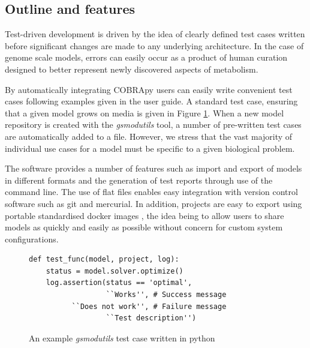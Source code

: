 \documentclass[journal=asbcd6]{achemso}
\begin{document}
\subsection{Outline and features}
Test-driven development is driven by the idea of clearly defined test cases written before significant changes are made to any underlying architecture.
In the case of genome scale models, errors can easily occur as a product of human curation designed to better represent newly discovered aspects of metabolism.

By automatically integrating COBRApy \cite{ebrahim2013cobrapy} users can easily write convenient test cases following examples given in the user guide.
A standard test case, ensuring that a given model grows on media is given in Figure \ref{fig:test_case}.
When a new model repository is created with the \textit{gsmodutils} tool, a number of pre-written test cases are automatically added to a file.
However, we stress that the vast majority of individual use cases for a model must be specific to a given biological problem.

The software provides a number of features such as import and export of models in different formats and the generation of test reports through use of the command line. 
The use of flat files enables easy integration with version control software such as git and mercurial.
In addition, projects are easy to export using portable standardised docker images \cite{merkel2014docker}, the idea being to allow users to share models as quickly and easily as possible without concern for custom system configurations.

\begin{figure}[ht]

\lstset{language=python}   
\begin{lstlisting}
def test_func(model, project, log):
    status = model.solver.optimize()
    log.assertion(status == 'optimal',
                  ``Works'', # Success message
		  ``Does not work'', # Failure message
                  ``Test description'')
\end{lstlisting}
\caption{An example \textit{gsmodutils} test case written in python}
\label{fig:test_case} 
\end{figure}
\end{document}
